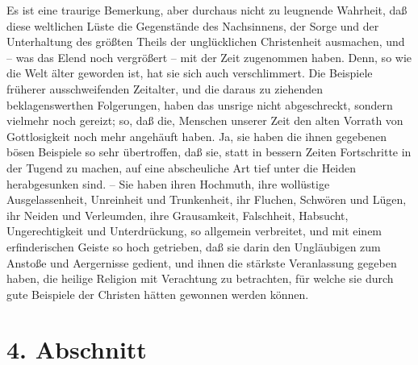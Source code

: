 Es ist eine traurige Bemerkung, aber durchaus nicht zu leugnende Wahrheit, daß diese weltlichen Lüste die Gegenstände des Nachsinnens, der Sorge und der Unterhaltung des größten Theils der unglücklichen Christenheit ausmachen, und – was das Elend noch vergrößert – mit der Zeit zugenommen haben. Denn, so wie die Welt älter geworden ist, hat sie sich auch verschlimmert. Die Beispiele früherer ausschweifenden Zeitalter, und die daraus zu ziehenden beklagenswerthen Folgerungen, haben das unsrige nicht abgeschreckt, sondern vielmehr noch gereizt; so, daß die, Menschen unserer Zeit den alten Vorrath von Gottlosigkeit noch mehr angehäuft haben. Ja, sie haben die ihnen gegebenen bösen Beispiele so sehr übertroffen, daß sie, statt in bessern Zeiten Fortschritte in der Tugend zu machen, auf eine abscheuliche Art tief unter die Heiden herabgesunken sind. – Sie haben ihren Hochmuth, ihre wollüstige Ausgelassenheit, Unreinheit und Trunkenheit, ihr Fluchen, Schwören und Lügen, ihr Neiden und Verleumden, ihre Grausamkeit, Falschheit, Habsucht, Ungerechtigkeit und Unterdrückung, so allgemein verbreitet, und mit einem erfinderischen Geiste so hoch getrieben, daß sie darin den Ungläubigen zum Anstoße und Aergernisse gedient, und ihnen die stärkste Veranlassung gegeben haben, die heilige Religion mit Verachtung zu betrachten, für welche sie durch gute Beispiele der Christen hätten gewonnen werden können. 

\section{4. Abschnitt}

